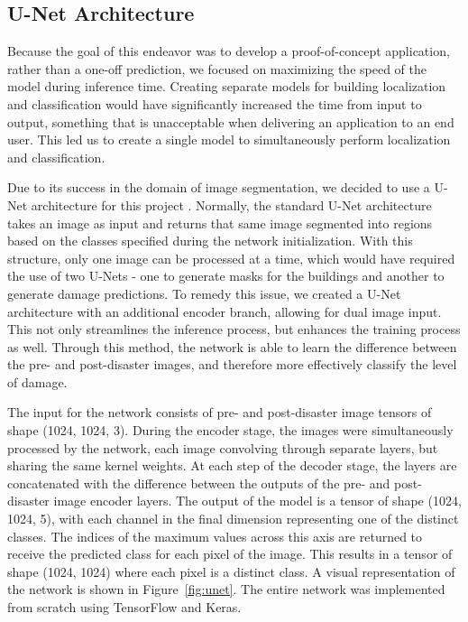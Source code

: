 \documentclass[conference]{IEEEtran}
\begin{document}
\subsection{U-Net Architecture}
Because the goal of this endeavor was to develop a proof-of-concept application, rather than a one-off prediction, we focused on maximizing the speed of the model during inference time. Creating separate models for building localization and classification would have significantly increased the time from input to output, something that is unacceptable when delivering an application to an end user. This led us to create a single model to simultaneously perform localization and classification.

Due to its success in the domain of image segmentation, we decided to use a U-Net architecture for this project \cite{a2}. Normally, the standard U-Net architecture takes an image as input and returns that same image segmented into regions based on the classes specified during the network initialization. With this structure, only one image can be processed at a time, which would have required the use of two U-Nets - one to generate masks for the buildings and another to generate damage predictions. To remedy this issue, we created a U-Net architecture with an additional encoder branch, allowing for dual image input. This not only streamlines the inference process, but enhances the training process as well. Through this method, the network is able to learn the difference between the pre- and post-disaster images, and therefore more effectively classify the level of damage.

The input for the network consists of pre- and post-disaster image tensors of shape (1024, 1024, 3). During the encoder stage, the images were simultaneously processed by the network, each image convolving through separate layers, but sharing the same kernel weights. At each step of the decoder stage, the layers are concatenated with the difference between the outputs of the pre- and post-disaster image encoder layers. The output of the model is a tensor of shape (1024, 1024, 5), with each channel in the final dimension representing one of the distinct classes. The indices of the maximum values across this axis are returned to receive the predicted class for each pixel of the image. This results in a tensor of shape (1024, 1024) where each pixel is a distinct class. A visual representation of the network is shown in Figure~\ref{fig:unet}. The entire network was implemented from scratch using TensorFlow and Keras.
\end{document}
